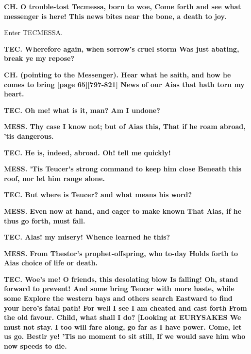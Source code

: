 \documentclass[11pt,letter]{book}
\begin{document}
\par \textbf{CH. O trouble-tost Tecmessa, born to woe, Come forth and see what messenger is here! This news bites near the bone, a death to joy.}
\par 

\par  Enter TECMESSA.

\par \textbf{TEC. Wherefore again, when sorrow’s cruel storm Was just abating, break ye my repose?}
\par 

\par \textbf{CH. (pointing to the Messenger). Hear what he saith, and how he comes to bring [page 65][797-821] News of our Aias that hath torn my heart.}
\par 

\par \textbf{TEC. Oh me! what is it, man? Am I undone?}
\par 

\par \textbf{MESS. Thy case I know not; but of Aias this, That if he roam abroad, ’tis dangerous.}
\par 

\par \textbf{TEC. He is, indeed, abroad. Oh! tell me quickly!}
\par 

\par \textbf{MESS. ’Tis Teucer’s strong command to keep him close Beneath this roof, nor let him range alone.}
\par 

\par \textbf{TEC. But where is Teucer? and what means his word?}
\par 

\par \textbf{MESS. Even now at hand, and eager to make known That Aias, if he thus go forth, must fall.}
\par 

\par \textbf{TEC. Alas! my misery! Whence learned he this?}
\par 

\par \textbf{MESS. From Thestor’s prophet-offspring, who to-day Holds forth to Aias choice of life or death.}
\par 

\par \textbf{TEC. Woe’s me! O friends, this desolating blow Is falling! Oh, stand forward to prevent! And some bring Teucer with more haste, while some Explore the western bays and others search Eastward to find your hero’s fatal path! For well I see I am cheated and cast forth From the old favour. Child, what shall I do? [Looking at EURYSAKES We must not stay. I too will fare along, go far as I have power. Come, let us go. Bestir ye! ’Tis no moment to sit still, If we would save him who now speeds to die.}
\par 
\end{document}
